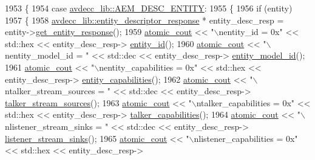 \begin{DoxyCode}
1953     \{
1954     \textcolor{keywordflow}{case} \hyperlink{namespaceavdecc__lib_ac7b7d227e46bc72b63ee9e9aae15902fac9ebb31a55e5894637f6c3c710ceceaf}{avdecc\_lib::AEM\_DESC\_ENTITY}:
1955     \{
1956         \textcolor{keywordflow}{if} (entity)
1957         \{
1958             \hyperlink{classavdecc__lib_1_1entity__descriptor__response}{avdecc\_lib::entity\_descriptor\_response} * entity\_desc\_resp
       = entity->\hyperlink{classavdecc__lib_1_1entity__descriptor_ac31dd117f0c931ae93c8ba52df7211bd}{get\_entity\_response}();
1959             \hyperlink{cmd__line_8h_a0bc38ccc65c79ba06c6fcd7b4bf554c3}{atomic\_cout} << \textcolor{stringliteral}{"\(\backslash\)nentity\_id = 0x"} << std::hex << entity\_desc\_resp->
      \hyperlink{classavdecc__lib_1_1entity__descriptor__response_a3374e7e9d63f8e1756480b16df9bc0c0}{entity\_id}();
1960             \hyperlink{cmd__line_8h_a0bc38ccc65c79ba06c6fcd7b4bf554c3}{atomic\_cout} << \textcolor{stringliteral}{"\(\backslash\)nentity\_model\_id = "} << std::dec << entity\_desc\_resp->
      \hyperlink{classavdecc__lib_1_1entity__descriptor__response_a68689ddf5ed9995909b3d980af23ffe7}{entity\_model\_id}();
1961             \hyperlink{cmd__line_8h_a0bc38ccc65c79ba06c6fcd7b4bf554c3}{atomic\_cout} << \textcolor{stringliteral}{"\(\backslash\)nentity\_capabilities = 0x"} << std::hex << entity\_desc\_resp->
      \hyperlink{classavdecc__lib_1_1entity__descriptor__response_a94d0ea1aebf4f504d143f7a4679c6e73}{entity\_capabilities}();
1962             \hyperlink{cmd__line_8h_a0bc38ccc65c79ba06c6fcd7b4bf554c3}{atomic\_cout} << \textcolor{stringliteral}{"\(\backslash\)ntalker\_stream\_sources = "} << std::dec << entity\_desc\_resp->
      \hyperlink{classavdecc__lib_1_1entity__descriptor__response_a5a93d7a7d491c78d68d0058fa92d61c1}{talker\_stream\_sources}();
1963             \hyperlink{cmd__line_8h_a0bc38ccc65c79ba06c6fcd7b4bf554c3}{atomic\_cout} << \textcolor{stringliteral}{"\(\backslash\)ntalker\_capabilities = 0x"} << std::hex << entity\_desc\_resp->
      \hyperlink{classavdecc__lib_1_1entity__descriptor__response_aed07d99ea1264dcae25f7980cda6e9c5}{talker\_capabilities}();
1964             \hyperlink{cmd__line_8h_a0bc38ccc65c79ba06c6fcd7b4bf554c3}{atomic\_cout} << \textcolor{stringliteral}{"\(\backslash\)nlistener\_stream\_sinks = "} << std::dec << entity\_desc\_resp->
      \hyperlink{classavdecc__lib_1_1entity__descriptor__response_abe7ac8090951c2afa1243d56969cb67d}{listener\_stream\_sinks}();
1965             \hyperlink{cmd__line_8h_a0bc38ccc65c79ba06c6fcd7b4bf554c3}{atomic\_cout} << \textcolor{stringliteral}{"\(\backslash\)nlistener\_capabilities = 0x"} << std::hex << entity\_desc\_resp->

\end{DoxyCode}
